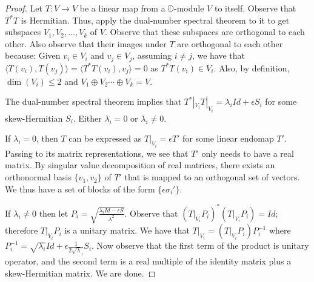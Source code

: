 \documentclass[
]{article}
\theoremstyle{theorem}
\theoremstyle{proposition}
\begin{document}
\begin{proof}
Let \(T:V \to V\) be a linear map from a \(\mathbb D\)-module \(V\) to itself. Observe that \(T^*T\) is Hermitian. Thus, apply the dual-number spectral theorem to it to get subspaces \(V_1, V_2, \dotsc, V_k\) of \(V\). Observe that these subspaces are orthogonal to each other. Also observe that their images under \(T\) are orthogonal to each other because: Given \(v_i \in V_i\) and \(v_j \in V_j\), assuming \(i \neq j\), we have that \(\langle T(v_i), T(v_j) \rangle = \langle T^*T(v_i), v_j \rangle = 0\) as \(T^*T(v_i) \in V_i\). Also, by definition, \(\dim(V_i) \leq 2\) and \(V_1 \oplus V_2 \dotsb \oplus V_k = V\).

The dual-number spectral theorem implies that \(T^*|_{V_i}T|_{V_i} = \lambda_i Id + \epsilon S_i\) for some skew-Hermitian \(S_i\). Either \(\lambda_i = 0\) or \(\lambda_i \neq 0\).

If \(\lambda_i = 0\), then \(T\) can be expressed as \(T|_{V_i} = \epsilon T'\) for some linear endomap \(T'\). Passing to its matrix representations, we see that \(T'\) only needs to have a real matrix. By singular value decomposition of real matrices, there exists an orthonormal basis \(\{v_1, v_2\}\) of \(T'\) that is mapped to an orthogonal set of vectors. We thus have a set of blocks of the form \(\{\epsilon \sigma_i'\}\).

If \(\lambda_i \neq 0\) then let \(P_i = \sqrt{\frac{\lambda_i Id - \epsilon S}{\lambda^2}}\). Observe that \((T|_{V_i}P_i)^*(T|_{V_i}P_i) = Id\); therefore \(T|_{V_i}P_i\) is a unitary matrix. We have that \(T|_{V_i} = (T|_{V_i}P_i)P_i^{-1}\) where \(P_i^{-1} = \sqrt{\lambda_i} Id + \epsilon \frac 1 {2 \sqrt\lambda_i}S_i\). Now observe that the first term of the product is unitary operator, and the second term is a real multiple of the identity matrix plus a skew-Hermitian matrix. We are done.

\end{proof}
\end{document}
